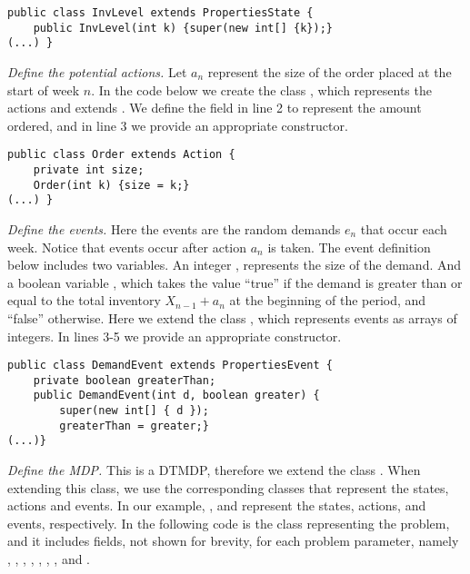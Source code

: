 \begin{lstlisting}
public class InvLevel extends PropertiesState {
	public InvLevel(int k) {super(new int[] {k});}
(...) }
 \end{lstlisting}
		

\emph{Define the potential actions.}
Let $a_n$ represent the size of the order placed at the start of week $n$. 
In the code below we create the class , which represents the
actions and extends . We define the field  in line
2 to represent the amount ordered, and in line 3 we provide an appropriate
constructor.


\begin{lstlisting}
public class Order extends Action {
	private int size;
	Order(int k) {size = k;}
(...) }						
\end{lstlisting}
				
\emph{Define the events.} 
Here the events are the random demands $e_n$ that occur each week. Notice
that events occur after action $a_n$ is taken. 	The event definition below
includes two variables. An integer , represents the size of the
demand. And a boolean variable , which takes the value
``true'' if the demand  is greater than or equal to the total
inventory $X_{n-1}+a_n$ at the beginning of the period, and ``false''
otherwise.  
Here we extend the class , which represents events as arrays of integers.  In lines 3-5 we provide an appropriate
constructor. 
	
\begin{lstlisting}
public class DemandEvent extends PropertiesEvent {				
	private boolean greaterThan;				
	public DemandEvent(int d, boolean greater) {
		super(new int[] { d });
		greaterThan = greater;}				
(...)}							
\end{lstlisting}

\emph{Define the MDP.} 
This is a DTMDP, therefore we extend the class . When extending
this class, we use the corresponding classes that represent the states, actions
and events. In our example, ,  and
 represent the states, actions, and events, respectively.
In the following code  is the class representing the
problem, and it includes fields, not shown for brevity, for each problem
parameter, namely , , , , ,
, , and .



